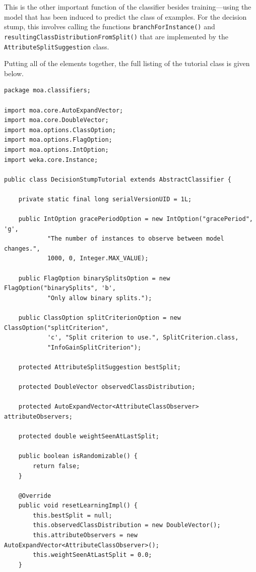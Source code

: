 \documentclass[a4paper,12pt]{article}
\begin{document}
This is the other important function of the classifier besides training---using the model that has been induced to predict the class of examples. For the decision stump, this involves calling the functions \verb+branchForInstance()+ and \verb+resultingClassDistributionFromSplit()+ that are implemented by the \verb+AttributeSplitSuggestion+ class.

Putting all of the elements together, the full listing of the tutorial class is given below.

\begin{lstlisting}[caption={Full listing},label=lst:fullclassifier]
package moa.classifiers;

import moa.core.AutoExpandVector;
import moa.core.DoubleVector;
import moa.options.ClassOption;
import moa.options.FlagOption;
import moa.options.IntOption;
import weka.core.Instance;

public class DecisionStumpTutorial extends AbstractClassifier {

	private static final long serialVersionUID = 1L;

	public IntOption gracePeriodOption = new IntOption("gracePeriod", 'g',
			"The number of instances to observe between model changes.",
			1000, 0, Integer.MAX_VALUE);

	public FlagOption binarySplitsOption = new FlagOption("binarySplits", 'b',
			"Only allow binary splits.");

	public ClassOption splitCriterionOption = new ClassOption("splitCriterion",
			'c', "Split criterion to use.", SplitCriterion.class,
			"InfoGainSplitCriterion");

	protected AttributeSplitSuggestion bestSplit;

	protected DoubleVector observedClassDistribution;

	protected AutoExpandVector<AttributeClassObserver> attributeObservers;

	protected double weightSeenAtLastSplit;

	public boolean isRandomizable() {
		return false;
	}

	@Override
	public void resetLearningImpl() {
		this.bestSplit = null;
		this.observedClassDistribution = new DoubleVector();
		this.attributeObservers = new AutoExpandVector<AttributeClassObserver>();
		this.weightSeenAtLastSplit = 0.0;
	}


\end{lstlisting}
\end{document}

